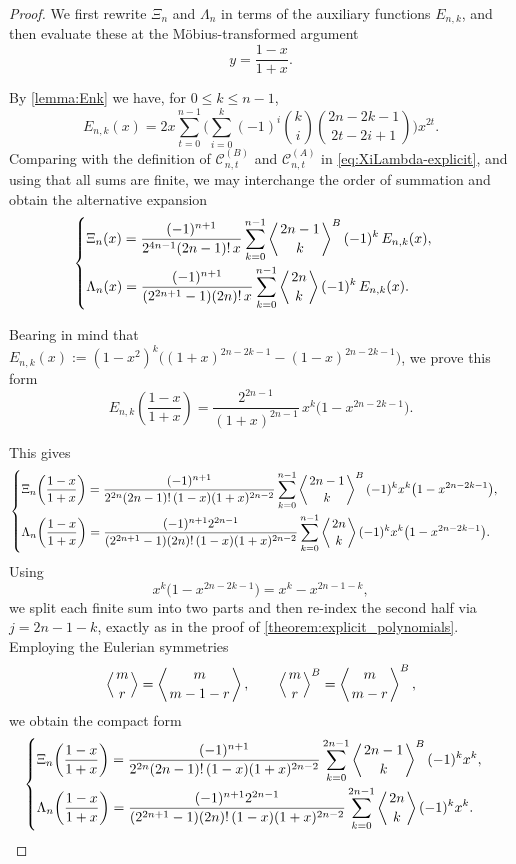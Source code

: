 \documentclass[11pt,twoside]{article}
\numberwithin{equation}{section}
\begin{document}
\begin{proof}
We first rewrite $\Xi_n$ and $\Lambda_n$ in terms of the auxiliary functions
$E_{n,k}$, and then evaluate these at the Möbius-transformed argument
\[
y=\frac{1-x}{1+x}.
\]

By \cref{lemma:Enk} we have, for $0\le k\le n-1$,
\[
E_{n,k}(x)
=
2x\sum_{t=0}^{n-1}
\biggl(
\sum_{i=0}^{k}
(-1)^i\binom{k}{i}
\binom{2n-2k-1}{\,2t-2i+1\,}
\biggr)x^{2t}.
\]
Comparing with the definition of $\mathcal C^{(B)}_{n,t}$ and $\mathcal C^{(A)}_{n,t}$
in \eqref{eq:XiLambda-explicit}, and using that all sums are finite,
we may interchange the order of summation and obtain the alternative
expansion
\[
\begin{cases}
\displaystyle
\Xi_n(x)
=
\frac{(-1)^{n+1}}{2^{4n-1}(2n-1)!\,x}
\sum_{k=0}^{n-1}
\left\langle{2n-1\atop k}\right\rangle^{B}
(-1)^k\,E_{n,k}(x),\\[1.2em]
\displaystyle
\Lambda_n(x)
=
\frac{(-1)^{n+1}}{(2^{2n+1}-1)(2n)!\,x}
\sum_{k=0}^{n-1}
\left\langle{2n\atop k}\right\rangle
(-1)^k\,E_{n,k}(x).
\end{cases}
\]

Bearing in mind that $E_{n,k}(x):=(1-x^2)^k\Big((1+x)^{2n-2k-1}-(1-x)^{2n-2k-1}\Big)$, we prove this form
\[
E_{n,k}\!\left(\frac{1-x}{1+x}\right)
=
\frac{2^{2n-1}}{(1+x)^{2n-1}}\,
x^k\bigl(1-x^{2n-2k-1}\bigr).
\]

This gives
\[
\begin{cases}
\displaystyle
\Xi_n\!\left(\frac{1-x}{1+x}\right)
=
\frac{(-1)^{n+1}}{2^{2n}(2n-1)!\,(1-x)(1+x)^{2n-2}}
\sum_{k=0}^{n-1}
\left\langle{2n-1\atop k}\right\rangle^{B}
(-1)^k x^k\bigl(1-x^{2n-2k-1}\bigr),\\[1.2em]
\displaystyle
\Lambda_n\!\left(\frac{1-x}{1+x}\right)
=
\frac{(-1)^{n+1}2^{2n-1}}{(2^{2n+1}-1)(2n)!\,(1-x)(1+x)^{2n-2}}
\sum_{k=0}^{n-1}
\left\langle{2n\atop k}\right\rangle
(-1)^k x^k\bigl(1-x^{2n-2k-1}\bigr).
\end{cases}
\]
Using
\[
x^k\bigl(1-x^{2n-2k-1}\bigr)=x^k-x^{2n-1-k},
\]
we split each finite sum into two parts and then re-index the second half
via $j=2n-1-k$, exactly as in the proof of \cref{theorem:explicit_polynomials}.
Employing the Eulerian symmetries
\[
\left\langle{m\atop r}\right\rangle
=
\left\langle{m\atop m-1-r}\right\rangle,
\qquad
\left\langle{m\atop r}\right\rangle^{B}
=
\left\langle{m\atop m-r}\right\rangle^{B},
\]
we obtain the compact form
\[
\begin{cases}
\displaystyle
\Xi_n\!\left(\frac{1-x}{1+x}\right)
=
\frac{(-1)^{n+1}}{2^{2n}(2n-1)!\,(1-x)(1+x)^{2n-2}}
\sum_{k=0}^{2n-1}
\left\langle{2n-1\atop k}\right\rangle^{B}
(-1)^k x^{k},\\[1.2em]
\displaystyle
\Lambda_n\!\left(\frac{1-x}{1+x}\right)
=
\frac{(-1)^{n+1}2^{2n-1}}{(2^{2n+1}-1)(2n)!\,(1-x)(1+x)^{2n-2}}
\sum_{k=0}^{2n-1}
\left\langle{2n\atop k}\right\rangle
(-1)^k x^{k}.
\end{cases}
\]


\end{proof}
\end{document}
